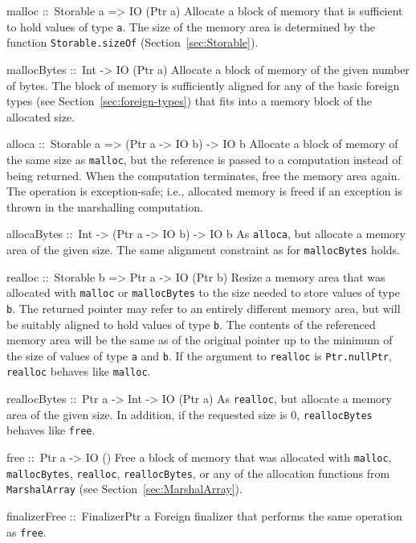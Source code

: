\documentclass[a4paper,twoside]{article}
\makeatletter
\newcommand{\code}[1]{\texttt{#1}}      %
\newenvironment{codedesc}{%
  \list{}{\labelwidth\z@
    \let\makelabel\codedesclabel}
  }{%
  \endlist
  }
\newcommand*{\codedesclabel}[1]{%
  \hspace{-\leftmargin}
  \parbox[b]{\labelwidth}{\makebox[0pt][l]{\code{#1}}\\}\hfil\relax
  }
\makeatother
\begin{document}
\begin{codedesc}
\item[malloc ::\ Storable a => IO (Ptr a)] Allocate a block of memory that is
  sufficient to hold values of type \code{a}.  The size of the memory area is
  determined by the function \code{Storable.sizeOf}
  (Section~\ref{sec:Storable}).

\item[mallocBytes ::\ Int -> IO (Ptr a)] Allocate a block of memory of the
  given number of bytes.  The block of memory is sufficiently aligned for any
  of the basic foreign types (see Section~\ref{sec:foreign-types}) that fits
  into a memory block of the allocated size.
  
\item[alloca ::\ Storable a => (Ptr a -> IO b) -> IO b] Allocate a block of
  memory of the same size as \code{malloc}, but the reference is passed to a
  computation instead of being returned.  When the computation terminates,
  free the memory area again.  The operation is exception-safe; i.e.,
  allocated memory is freed if an exception is thrown in the marshalling
  computation.

\item[allocaBytes ::\ Int -> (Ptr a -> IO b) -> IO b] As \code{alloca}, but
  allocate a memory area of the given size.  The same alignment constraint as
  for \code{mallocBytes} holds.
  
\item[realloc ::\ Storable b => Ptr a -> IO (Ptr b)] Resize a memory area that
  was allocated with \code{malloc} or \code{mallocBytes} to the size needed to
  store values of type \code{b}.  The returned pointer may refer to an
  entirely different memory area, but will be suitably aligned to hold values
  of type \code{b}.  The contents of the referenced memory area will be the
  same as of the original pointer up to the minimum of the size of values of
  type \code{a} and \code{b}.  If the argument to \code{realloc} is
  \code{Ptr.nullPtr}, \code{realloc} behaves like \code{malloc}.
  
\item[reallocBytes ::\ Ptr a -> Int -> IO (Ptr a)] As \code{realloc}, but
  allocate a memory area of the given size.  In addition, if the requested size
  is 0, \code{reallocBytes} behaves like \code{free}.
  
\item[free ::\ Ptr a -> IO ()] Free a block of memory that was allocated with
  \code{malloc}, \code{mallocBytes}, \code{realloc}, \code{reallocBytes}, or
  any of the allocation functions from \code{MarshalArray} (see
  Section~\ref{sec:MarshalArray}).

\item[finalizerFree ::\ FinalizerPtr a] Foreign finalizer that performs the
  same operation as \code{free}.
\end{codedesc}
\end{document}
